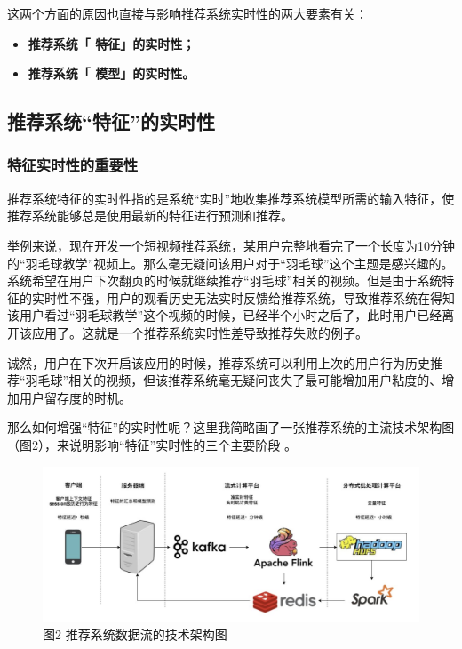 \documentclass[12pt]{article}
\begin{document}
这两个方面的原因也直接与影响推荐系统实时性的两大要素有关：
\begin{itemize}
\setlength{\itemsep}{0pt}
\setlength{\parsep}{0pt}
\setlength{\parskip}{0pt}
    \item \textbf{推荐系统「 特征」的实时性；}
    \item \textbf{推荐系统「 模型」的实时性。}
\end{itemize}

\subsection{推荐系统“特征”的实时性}
\subsubsection{特征实时性的重要性}
推荐系统特征的实时性指的是系统“实时”地收集推荐系统模型所需的输入特征，使推荐系统能够总是使用最新的特征进行预测和推荐。

\begin{framed}
举例来说，现在开发一个短视频推荐系统，某用户完整地看完了一个长度为10分钟的“羽毛球教学”视频上。那么毫无疑问该用户对于“羽毛球”这个主题是感兴趣的。系统希望在用户下次翻页的时候就继续推荐“羽毛球”相关的视频。但是由于系统特征的实时性不强，用户的观看历史无法实时反馈给推荐系统，导致推荐系统在得知该用户看过“羽毛球教学”这个视频的时候，已经半个小时之后了，此时用户已经离开该应用了。这就是一个推荐系统实时性差导致推荐失败的例子。
\end{framed}

诚然，用户在下次开启该应用的时候，推荐系统可以利用上次的用户行为历史推荐“羽毛球”相关的视频，但该推荐系统毫无疑问丧失了最可能增加用户粘度的、增加用户留存度的时机。

那么如何增强“特征”的实时性呢？这里我简略画了一张推荐系统的主流技术架构图（图2），来说明影响“特征”实时性的三个主要阶段 。
\begin{figure}[H]
    \centering
    \includegraphics[width=.8\textwidth]{fig/Recommender_System_Data_Stream_Architecture.png}
    \caption*{图2 推荐系统数据流的技术架构图}
\end{figure}
\end{document}
